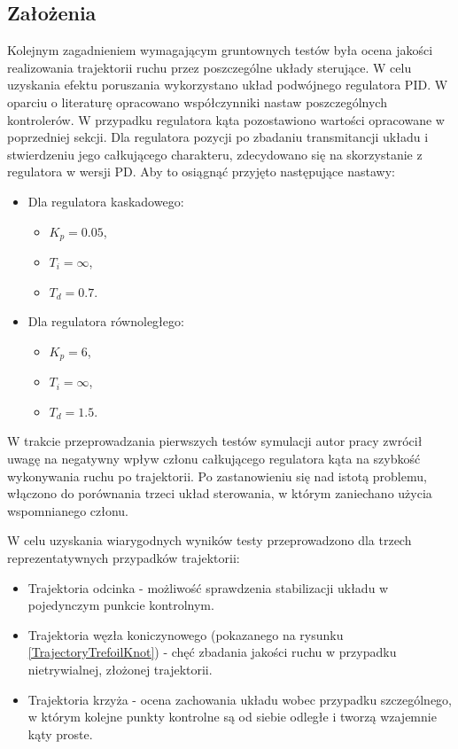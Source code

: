 \documentclass[12pt, oneside]{report}
\theoremstyle{definition}
\begin{document}
\subsection{Założenia}
\label{Reqs}
Kolejnym zagadnieniem wymagającym gruntownych testów była ocena jakości realizowania trajektorii ruchu przez poszczególne układy sterujące. W celu uzyskania efektu poruszania wykorzystano układ podwójnego regulatora PID. W oparciu o literaturę opracowano współczynniki nastaw poszczególnych kontrolerów. W przypadku regulatora kąta pozostawiono wartości opracowane w poprzedniej sekcji. Dla regulatora pozycji po zbadaniu transmitancji układu i stwierdzeniu jego całkującego charakteru, zdecydowano się na skorzystanie z regulatora w wersji PD. Aby to osiągnąć przyjęto następujące nastawy:
\begin{itemize}
\item Dla regulatora kaskadowego:
\begin{itemize}
\item $K_p = 0.05$,
\item $T_i = \infty$,
\item $T_d = 0.7$.
\end{itemize}
\item Dla regulatora równoległego:
\begin{itemize}
\item $K_p = 6$,
\item $T_i = \infty$,
\item $T_d = 1.5$.
\end{itemize}
\end{itemize}

W trakcie przeprowadzania pierwszych testów symulacji autor pracy zwrócił uwagę na negatywny wpływ członu całkującego regulatora kąta na szybkość wykonywania ruchu po trajektorii. Po zastanowieniu się nad istotą problemu, włączono do porównania trzeci układ sterowania, w którym zaniechano użycia wspomnianego członu.


W celu uzyskania wiarygodnych wyników testy przeprowadzono dla trzech reprezentatywnych przypadków trajektorii:
\begin{itemize}
\item Trajektoria odcinka - możliwość sprawdzenia stabilizacji układu w pojedynczym punkcie kontrolnym.
\item Trajektoria węzła koniczynowego (pokazanego na rysunku \ref{TrajectoryTrefoilKnot}) - chęć zbadania jakości ruchu w przypadku nietrywialnej, złożonej trajektorii.
\item Trajektoria krzyża - ocena zachowania układu wobec przypadku szczególnego, w którym kolejne punkty kontrolne są od siebie odległe i tworzą wzajemnie kąty proste.
\end{itemize}
\end{document}
